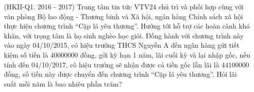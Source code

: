 \begin{bt}%
	{(HKII-Q1. 2016 - 2017)} Trung tâm tin tức VTV24 chủ trì và phối hợp cùng với văn phòng Bộ lao động - Thương binh và Xã hội, ngân hàng Chính sách xã hội thực hiện chương trình ``Cặp lá yêu thương''. Hướng tới hỗ trợ các hoàn cành khó khăn, với trọng tâm là họ sinh nghèo học giỏi. Đồng hành với chương trình này vào ngày 04/10/2015, có hiệu trưởng THCS Nguyễn A đến ngân hàng gửi tiết kiệm số tiền là $40 000 000$ đồng, gởi kỳ hạn 1 năm, lãi cuối kỳ và lại nhập gốc, nếu tính đến 04/10/2017, cô hiệu trưởng sẽ nhận được cả tiền gốc lẫn lãi là $44 100 000$ đồng, số tiền này được chuyển đến chương trình ``Cặp lá yêu thương''. Hỏi lãi suất mỗi năm là bao nhiêu phần trăm?
\end{bt}

